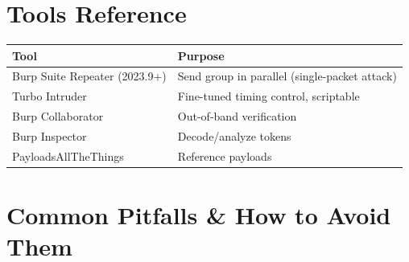 \documentclass[11pt]{article}
\begin{document}
\section{Tools Reference}

\begin{center}
\begin{tabular}{|l|l|}
\hline
\textbf{Tool} & \textbf{Purpose} \\
\hline
Burp Suite Repeater (2023.9+) & Send group in parallel (single-packet attack) \\
Turbo Intruder & Fine-tuned timing control, scriptable \\
Burp Collaborator & Out-of-band verification \\
Burp Inspector & Decode/analyze tokens \\
PayloadsAllTheThings & Reference payloads \\
\hline
\end{tabular}
\end{center}

\section{Common Pitfalls \& How to Avoid Them}
\end{document}
